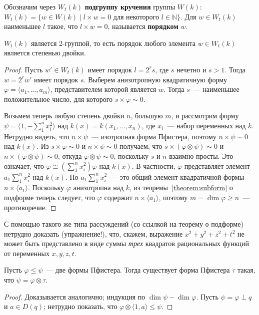 \documentclass[a4paper,oneside,12pt]{article}
\theoremstyle{plain} { \swapnumbers
\newtheorem{theorem}{Теорема}[subsection]
\newtheorem{corollary}[theorem]{Следствие}
\newtheorem{lemma}[theorem]{Лемма}
\newtheorem{proposition}[theorem]{Утверждение}
\newtheorem{claim}[theorem]{Факт}
}
\theoremstyle{definition} { \swapnumbers
\newtheorem{definition}[theorem]{Определение}
\newtheorem{notation}[theorem]{Обозначение}
\newtheorem{remark}[theorem]{Замечание}
\newtheorem{remarks}[theorem]{Замечания}
\newtheorem{example}[theorem]{Пример}
\newtheorem{examples}[theorem]{Примеры}
\newtheorem{sssection}[theorem]{}
}
\def\ph{\varphi}
\def\la{\langle}
\def\ra{\rangle}
\begin{document}
\begin{definition}
Обозначим через $W_t(k)$ {\bf подгруппу кручения} группы $W(k)$:
$W_t(k)=\{w\in W(k)\mid l\times w=0\text{ для некоторого }l\in\mathbb N\}$.
Для $w\in W_t(k)$ наименьшее $l$ такое, что $l\times w=0$, называется
{\bf порядком} $w$.
\end{definition}

\begin{theorem}
$W_t(k)$ является 2-группой, то есть порядок любого элемента $w\in W_t(k)$
является степенью двойки.
\end{theorem}
\begin{proof}
Пусть $w'\in W_t(k)$ имеет порядок $l=2^rs$, где $s$ нечетно и $s>1$.
Тогда $w=2^rw'$ имеет порядок $s$. Выберем анизотропную квадратичную форму
$\ph=\la a_1,\dots,a_m\ra$,
представителем которой является $w$. Тогда $s$~--- наименьшее положительное
число, для которого $s\times\ph\sim 0$.

Возьмем теперь любую степень двойки $n$, большую $m$, и рассмотрим форму
$\psi=\la 1,-\sum_1^nx_i^2\ra$ над $k(x)=k(x_1,\dots,x_n)$, где $x_i$~---
набор переменных над $k$. Нетрудно видеть, что $n\times\psi$~---
изотропная форма Пфистера, поэтому $n\times\psi\sim 0$ над $k(x)$.
Из $s\times\ph\sim 0$ и $n\times\psi\sim 0$ получаем, что
$s\times(\ph\otimes\psi)\sim 0$ и $n\times(\ph\otimes\psi)\sim 0$,
откуда $\ph\otimes\psi\sim 0$, поскольку $s$ и $n$ взаимно просты.
Это означает, что $\ph\cong(\sum_1^nx_i^2)\ph$ над $k(x)$.
В частности, $\ph$ представляет элемент $a_1\sum_1^nx_i^2$ над $k(x)$.
Но $a_1\sum_1^nx_i^2$~--- это общий элемент квадратичной формы $n\times\la a_1\ra$.
Поскольку $\ph$ анизотропна над $k$, из теоремы~\ref{theorem:subform} о подформе теперь следует, что
$\ph$ содержит $n\times\la a_1\ra$, поэтому $m=\dim\ph\geq n$~--- противоречие.
\end{proof}

\begin{remark}
С помощью такого же типа рассуждений (со ссылкой на теорему о подформе) нетрудно
доказать (упражнение!), что, скажем, выражение $x^2+y^2+z^2+t^2$ не может быть представлено в виде
суммы {\it трех} квадратов рациональных функций от переменных $x,y,z,t$.
\end{remark}

\begin{theorem}
Пусть $\ph\leq\psi$~--- две формы Пфистера. Тогда существует форма Пфистера $\tau$ такая, что
$\psi=\ph\otimes\tau$.
\end{theorem}
\begin{proof}
Доказывается аналогично; индукция по $\dim\psi-\dim\ph$. Пусть $\psi=\ph\perp q$ и $a\in D(q)$;
нетрудно показать, что $\ph\otimes\la 1,a\ra\leq\psi$.
\end{proof}
\end{document}
